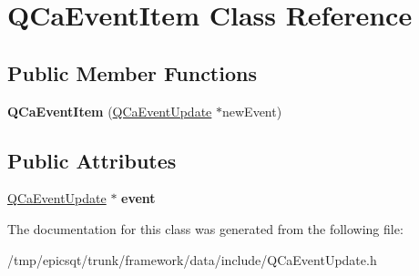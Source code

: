 \hypertarget{classQCaEventItem}{
\section{QCaEventItem Class Reference}
\label{classQCaEventItem}
}
\subsection*{Public Member Functions}
\begin{DoxyCompactItemize}
\item 
\hypertarget{classQCaEventItem_a22e7ca6a3b51d51d7683abe3e0d62eee}{
{\bfseries QCaEventItem} (\hyperlink{classQCaEventUpdate}{QCaEventUpdate} $\ast$newEvent)}
\label{classQCaEventItem_a22e7ca6a3b51d51d7683abe3e0d62eee}

\end{DoxyCompactItemize}
\subsection*{Public Attributes}
\begin{DoxyCompactItemize}
\item 
\hypertarget{classQCaEventItem_a2d8effa602e80bc004231cbf0fe62133}{
\hyperlink{classQCaEventUpdate}{QCaEventUpdate} $\ast$ {\bfseries event}}
\label{classQCaEventItem_a2d8effa602e80bc004231cbf0fe62133}

\end{DoxyCompactItemize}


The documentation for this class was generated from the following file:\begin{DoxyCompactItemize}
\item 
/tmp/epicsqt/trunk/framework/data/include/QCaEventUpdate.h\end{DoxyCompactItemize}
